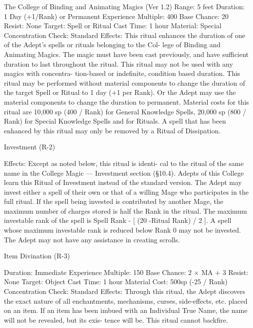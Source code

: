 \begin{Chapter}{The College of Binding and Animating Magics (Ver 1.2)}
Range: 5 feet 
Duration: 1 Day (+1/Rank) or Permanent 
Experience Multiple: 400 
Base Chance: 20%
Resist: None 
Target: Spell or Ritual 
Cast Time: 1 hour 
Material: Special 
Concentration Check: Standard 
Effects: This ritual enhances the duration of one of 
the  Adept’s  spells  or  rituals  belonging  to  the  Col-
lege of Binding and Animating Magics. The magic 
must have been cast previously, and have sufficient 
duration  to  last  throughout  the  ritual.  This  ritual 
may  not  be  used  with  any  magics  with  concentra-
tion-based  or  indefinite,  condition  based  duration. 
This  ritual  may  be  performed  without  material 
components  to  change  the  duration  of  the  target 
Spell  or  Ritual  to  1  day  (+1  per  Rank).  Or  the 
Adept may use the material components to change 
the  duration  to  permanent.  Material  costs  for  this 
ritual  are  10,000  sp  (400  /  Rank)  for  General 
Knowledge  Spells,  20,000  sp  (800  /  Rank)  for 
Special  Knowledge  Spells  and  for  Rituals.  A  spell 
that  has  been  enhanced  by  this  ritual  may  only  be 
removed by a Ritual of Dissipation. 

Investment (R-2) 

Effects: Except as noted below, this ritual is identi-
cal  to  the  ritual  of  the  same  name  in  the  College 
Magic  —  Investment  section  (§10.4).  Adepts  of 
this College learn this Ritual of Investment instead 
of  the  standard  version.  The  Adept  may  invest 
either a spell of their own or that of a willing Mage 
who participates in the full ritual. If the spell being 
invested  is  contributed  by  another  Mage,  the 
maximum  number  of  charges  stored  is  half  the 
Rank  in  the  ritual.  The  maximum  investable  rank 
of the spell is Spell Rank - [ (20 -Ritual Rank) / 2 ]. 
A spell whose maximum investable rank is reduced 
below Rank 0 may not be invested. The Adept may 
not have any assistance in creating scrolls. 

Item Divination (R-3) 

Duration: Immediate 
Experience Multiple: 150 
Base Chance: 2 × MA + 3%
Resist: None 
Target: Object 
Cast Time: 1 hour 
Material Cost: 500sp (-25 / Rank) 
Concentration Check: Standard 
Effects:  Through  this  ritual,  the  Adept  discovers 
the  exact nature  of  all  enchantments,  mechanisms, 
curses,  side-effects,  etc.  placed  on  an  item.  If  an 
item  has  been  imbued  with  an  Individual  True 
Name,  the  name  will  not be  revealed,  but  its  exis-
tence will be. This ritual cannot backfire. 


\end{Chapter}
